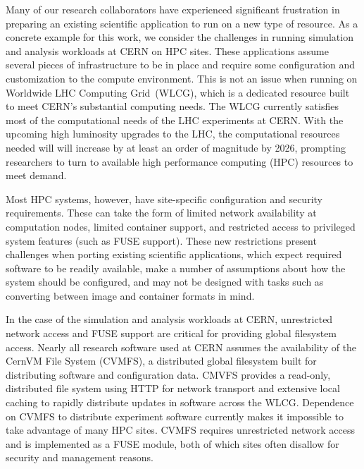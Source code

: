 \documentclass[conference]{IEEEtran}
\begin{document}
Many of our research collaborators have experienced significant frustration in preparing an existing scientific application to run on a new type of resource.
As a concrete example for this work,
we consider the challenges in running simulation and analysis workloads at CERN on HPC sites.
These applications assume several pieces of infrastructure to be in place and require some configuration and customization to the compute environment.
This is not an issue when running on Worldwide LHC Computing Grid~(WLCG),
which is a dedicated resource built to meet CERN's substantial computing needs.
The WLCG currently satisfies most of the computational needs of the LHC experiments at CERN.
With the upcoming high luminosity upgrades to the LHC,
the computational resources needed will will increase by at least an order of magnitude by 2026,
prompting researchers to turn to available high performance computing (HPC) resources to meet demand.

Most HPC systems, however, have site-specific configuration and security requirements.
These can take the form of limited network availability at computation nodes,
limited container support,
and restricted access to privileged system features (such as FUSE support).
These new restrictions present challenges when porting existing scientific applications,
which expect required software to be readily available,
make a number of assumptions about how the system should be configured,
and may not be designed with tasks such as converting between image and container formats in mind.

In the case of the simulation and analysis workloads at CERN,
unrestricted network access and FUSE support are critical for providing global filesystem access.
Nearly all research software used at CERN assumes the availability of the CernVM File System (CVMFS),
a distributed global filesystem built for distributing software and configuration data.
CMVFS provides a read-only, distributed file system using HTTP for network transport and extensive local
caching to rapidly distribute updates in software across the WLCG.
Dependence on CVMFS to distribute experiment software currently makes it impossible to take advantage of many HPC sites.
CVMFS requires unrestricted network access and is implemented as a FUSE module,
both of which sites often disallow for security and management reasons.
\end{document}
